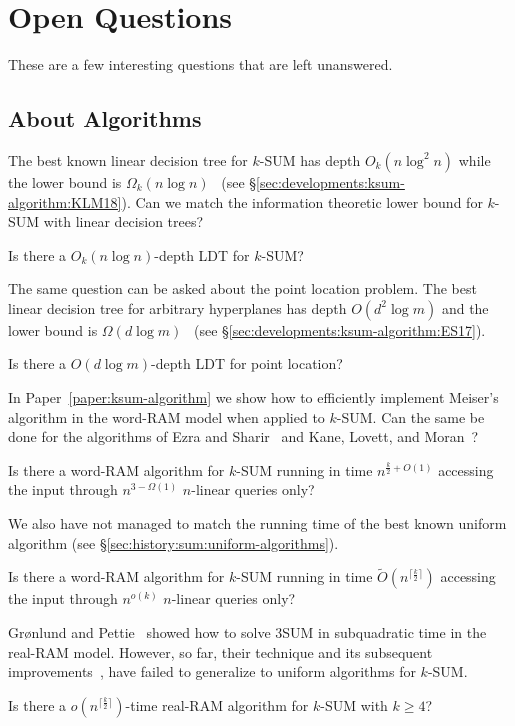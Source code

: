 \chapter{Open Questions}

These are a few interesting questions that are left unanswered.

\section{About Algorithms}

The best known linear decision tree for \(k\)-SUM has depth \(O_k(n \log^2 n)\) while
the lower bound is \(\Omega_k(n \log n)\)~\cite{KLM18}
(see \S\ref{sec:developments:ksum-algorithm:KLM18}).
Can we match the information theoretic lower bound for \(k\)-SUM with linear
decision trees?
\begin{openquestion}
Is there a \(O_k(n \log n)\)-depth LDT for \(k\)-SUM?
\end{openquestion}

The same question can be asked about the point location problem. The best
linear decision tree for arbitrary hyperplanes has depth \(O(d^2 \log m)\)
and the lower bound is \(\Omega(d \log m)\)~\cite{ES17}
(see \S\ref{sec:developments:ksum-algorithm:ES17}).
\begin{openquestion}
Is there a \(O(d \log m)\)-depth LDT for point location?
\end{openquestion}

In Paper~\ref{paper:ksum-algorithm}
we show how to efficiently implement Meiser's algorithm in the word-RAM model
when applied to \(k\)-SUM. Can the same be done for the algorithms of Ezra and
Sharir~\cite{ES17} and Kane, Lovett, and Moran~\cite{KLM18}?
\begin{openquestion}
Is there a word-RAM algorithm for \(k\)-SUM
running in time \(n^{\frac{k}{2}+O(1)}\)
accessing the input through \(n^{3 - \Omega(1)}\) \(n\)-linear queries only?
\end{openquestion}

We also have not managed to match the running time of the best known uniform
algorithm (see \S\ref{sec:history:sum:uniform-algorithms}).
\begin{openquestion}
Is there a word-RAM algorithm for \(k\)-SUM
running in time \( \tilde{O}(n^{\lceil \frac k2 \rceil})\)
accessing the input through \(n^{o(k)}\) \(n\)-linear queries only?
\end{openquestion}

Gr\o nlund and Pettie~\cite{GP18}
showed how to solve 3SUM in subquadratic time in the real-RAM model.
However, so far, their technique and its subsequent
improvements~\cite{Fr15,GS15,Ch18}, have failed to generalize to uniform algorithms
for \(k\)-SUM.
\begin{openquestion}
	Is there a \(o(n^{\lceil \frac k2 \rceil})\)-time real-RAM algorithm for
	\(k\)-SUM with \(k \geq 4\)?
\end{openquestion}


